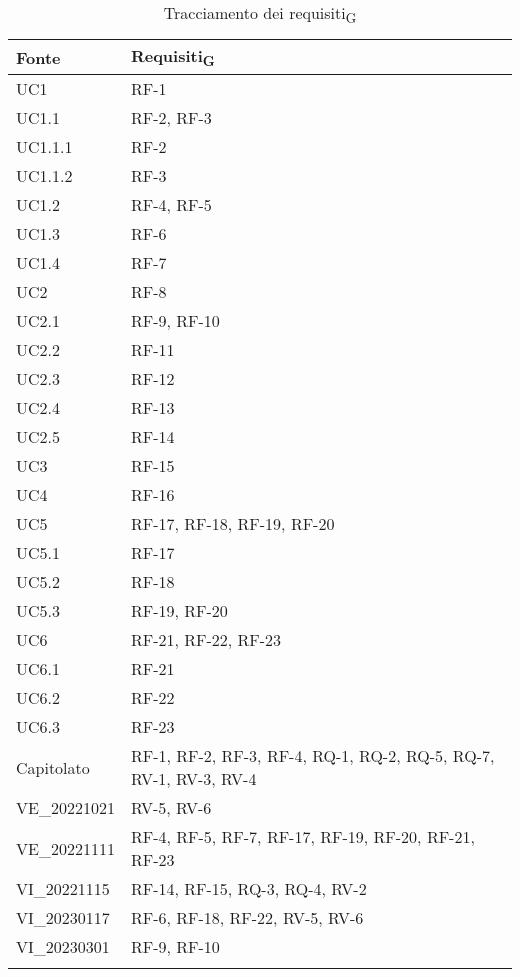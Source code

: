 \begin{center}
	\setlength\extrarowheight{5pt}
	\begin{xltabular}{\textwidth}{|X|X|}
	\hline
	\textbf{Fonte} & \textbf{Requisiti\textsubscript{G}} \\
	\hline
	UC1 & RF-1\\
	\hline
	UC1.1 & RF-2, RF-3\\
	\hline
	UC1.1.1 & RF-2\\
	\hline
	UC1.1.2 & RF-3\\
	\hline
	UC1.2 & RF-4, RF-5\\
	\hline
	UC1.3 & RF-6\\
	\hline
	UC1.4 & RF-7\\
	\hline
	UC2 & RF-8\\
	\hline
	UC2.1 & RF-9, RF-10\\
	\hline
	UC2.2 & RF-11\\
	\hline
	UC2.3 & RF-12\\
	\hline
	UC2.4 & RF-13\\
	\hline
	UC2.5 & RF-14\\
	\hline
	UC3 & RF-15\\ 
	\hline
	UC4 & RF-16\\
	\hline
	UC5 & RF-17, RF-18, RF-19, RF-20\\
	\hline
	UC5.1 & RF-17\\
	\hline
	UC5.2 & RF-18\\
	\hline
	UC5.3 & RF-19, RF-20\\
	\hline
	UC6 & RF-21, RF-22, RF-23\\
	\hline
	UC6.1 & RF-21\\
	\hline
	UC6.2 & RF-22\\
	\hline
	UC6.3 & RF-23\\
	\hline
	Capitolato & RF-1, RF-2, RF-3, RF-4, RQ-1, RQ-2, RQ-5, RQ-7, RV-1, RV-3, RV-4\\
	\hline
	VE\_20221021 & RV-5, RV-6\\
	\hline
	VE\_20221111 & RF-4, RF-5, RF-7, RF-17, RF-19, RF-20, RF-21, RF-23\\
	\hline
	VI\_20221115 & RF-14, RF-15, RQ-3, RQ-4, RV-2\\
	\hline
	VI\_20230117 & RF-6, RF-18, RF-22, RV-5, RV-6\\
	\hline
	VI\_20230301 & RF-9, RF-10\\
	\hline
	\caption{Tracciamento dei requisiti\textsubscript{G}}
	\end{xltabular}
\end{center}

